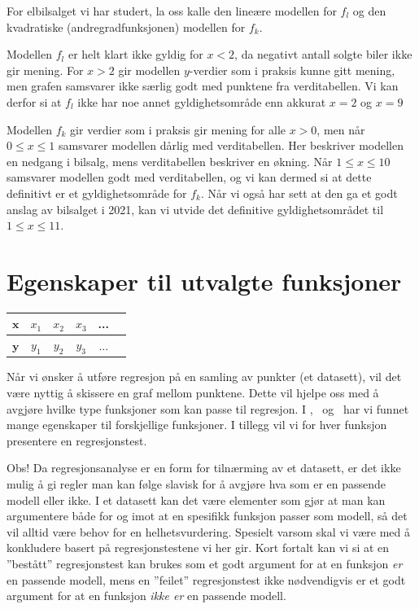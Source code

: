 For elbilsalget vi har studert, la oss kalle den lineære modellen for $f_l$ og den kvadratiske (andregradfunksjonen) modellen for $f_k$. \os

Modellen $f_l$ er helt klart ikke gyldig for ${x<2}$, da negativt antall solgte biler ikke gir mening. For $x>2$ gir modellen $y$-verdier som i praksis kunne gitt mening, men grafen samsvarer ikke særlig godt med punktene fra verditabellen. Vi kan derfor si at $f_l$ ikke har noe annet gyldighetsområde enn akkurat $x=2$ og $x=9$
\vsk

Modellen $f_k$ gir verdier som i praksis gir mening for alle $x>0$, men når $0\leq x \leq 1$ samsvarer modellen dårlig med verditabellen. Her beskriver modellen en nedgang i bilsalg, mens verditabellen beskriver en økning. Når $1\leq x \leq 10$ samsvarer modellen godt med verditabellen, og vi kan dermed si at dette definitivt er et gyldighetsområde for $f_k$. Når vi også har sett at den ga et godt anslag av bilsalget i 2021, kan vi utvide det definitive gyldighetsområdet til $1\leq x \leq 11$. 
\newpage

\section{Egenskaper til utvalgte funksjoner}
\begin{center}
	\begin{tabular}{l|c|c|c|c|c}
		$\bm x$& $x_1$ & $x_2$ & $x_3$&... \\ \hline
		$\bm y$& $y_1$ & $y_2$ & $y_3$&...
	\end{tabular}
\end{center}
Når vi ønsker å utføre regresjon på en samling av punkter (et datasett), vil det være nyttig å skissere en graf mellom punktene. Dette vil hjelpe oss med å avgjøre hvilke type funksjoner som kan passe til regresjon. I \mb, \tmen\ og \tmto\ har vi funnet mange egenskaper til forskjellige funksjoner. I tillegg vil vi for hver funksjon presentere en regresjonstest. \vsk

Obs! Da regresjonsanalyse er en form for tilnærming av et datasett, er det ikke mulig å gi regler man kan følge slavisk for å avgjøre hva som er en passende modell eller ikke. I et datasett kan det være elementer som gjør at man kan argumentere både for og imot at en spesifikk funksjon passer som modell, så det vil alltid være behov for en helhetsvurdering. Spesielt varsom skal vi være med å konkludere basert på regresjonstestene vi her gir. Kort fortalt kan vi si at en ''bestått'' regresjonstest kan brukes som et godt argument for at en funksjon \textsl{er} en passende modell, mens en ''feilet'' regresjonstest ikke nødvendigvis er et godt argument for at en funksjon \textsl{ikke er} en passende modell.

